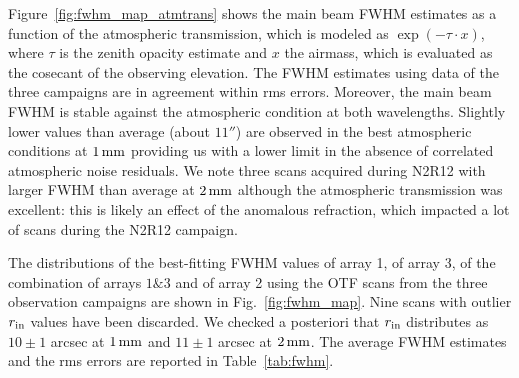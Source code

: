 Figure~\ref{fig:fwhm_map_atmtrans} shows the main beam FWHM estimates
as a function of the atmospheric transmission, which is modeled as
$\exp{\left(-\tau \cdot x\right)}$, where $\tau$ is the zenith opacity estimate and
$x$ the airmass, which is evaluated as the cosecant of the observing
elevation. The FWHM estimates using data of the three campaigns are in
agreement within rms errors. Moreover, the main beam FWHM is stable
against the atmospheric condition at both wavelengths. Slightly lower
values than average (about $11''$) are observed in the best
atmospheric conditions at $1\,\rm{mm}$ providing us with a lower limit
in the absence of correlated atmospheric noise residuals. We note
three scans acquired during N2R12 with larger FWHM than average at
$2\,\rm{mm}$ although the atmospheric transmission was excellent: this
is likely an effect of the anomalous refraction, which impacted
a lot of scans during the N2R12 campaign. 

The distributions of the best-fitting FWHM values of array 1, of array
3, of the combination of arrays $1\&3$ and of array 2 using the OTF scans from the
three observation campaigns are shown in Fig.~\ref{fig:fwhm_map}. Nine
scans with outlier $r_{\rm{in}}$ values have been discarded.
We checked a posteriori that $r_{\rm{in}}$
distributes as $10 \pm 1$ arcsec at $1\,\rm{mm}$ and $11 \pm 1$ arcsec
at $2\,\rm{mm}$. The average FWHM estimates and the rms errors are
reported in Table~\ref{tab:fwhm}.  


